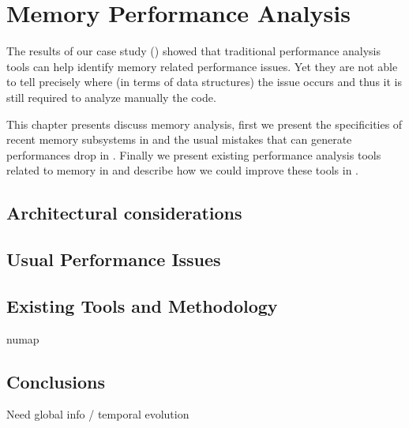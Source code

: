\chapter{Memory Performance Analysis}

The results of our case study () showed that traditional performance analysis tools can help identify memory related performance issues.
Yet they are not able to tell precisely where (in terms of data structures) the issue occurs and thus it is still required to analyze manually the code.

This chapter presents discuss memory analysis, first we present the specificities of recent memory subsystems in  and the usual mistakes that can generate performances drop in .
Finally we present existing performance analysis tools related to memory in  and describe how we could improve these tools in .

\section{Architectural considerations}
\label{sec:archi}

\section{Usual Performance Issues}
\label{sec:usual-issues}

\section{Existing Tools and Methodology}
\label{sec:mem-tools}

numap\cite{Selva16numap}

\section{Conclusions}
\label{sec:mem-cncl}

Need global info / temporal evolution
